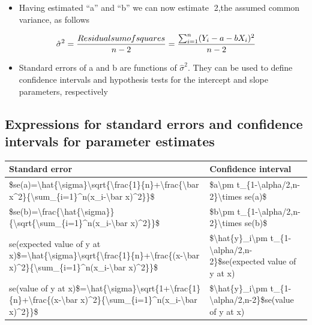 \documentclass[
]{book}
\providecommand{\tightlist}{%
  \setlength{\itemsep}{0pt}\setlength{\parskip}{0pt}}
\begin{document}
\begin{itemize}
\tightlist
\item
  Having estimated ``a'' and ``b'' we can now estimate 2,the assumed common variance, as follows
\end{itemize}

\[\hat{\sigma}^2=\frac{Residual\space sum\space of\space squares}{n-2}=\frac{\sum_{i=1}^n(Y_i-a-bX_i)^2}{n-2}\]

\begin{itemize}
\tightlist
\item
  Standard errors of a and b are functions of \(\hat{\sigma}^2\). They can be used to define confidence intervals and hypothesis tests for the intercept and slope parameters, respectively
\end{itemize}

\hypertarget{expressions-for-standard-errors-and-confidence-intervals-for-parameter-estimates}{%
\subsection{Expressions for standard errors and confidence intervals for parameter estimates}\label{expressions-for-standard-errors-and-confidence-intervals-for-parameter-estimates}}

\begin{tabular}{l|l}
\hline
Standard error & Confidence interval\\
\hline
\$se(a)=\textbackslash{}hat\{\textbackslash{}sigma\}\textbackslash{}sqrt\{\textbackslash{}frac\{1\}\{n\}+\textbackslash{}frac\{\textbackslash{}bar x\textasciicircum{}2\}\{\textbackslash{}sum\_\{i=1\}\textasciicircum{}n(x\_i-\textbackslash{}bar x)\textasciicircum{}2\}\}\$ & \$a\textbackslash{}pm t\_\{1-\textbackslash{}alpha/2,n-2\}\textbackslash{}times se(a)\$\\
\hline
\$se(b)=\textbackslash{}frac\{\textbackslash{}hat\{\textbackslash{}sigma\}\}\{\textbackslash{}sqrt\{\textbackslash{}sum\_\{i=1\}\textasciicircum{}n(x\_i-\textbackslash{}bar x)\textasciicircum{}2\}\}\$ & \$b\textbackslash{}pm t\_\{1-\textbackslash{}alpha/2,n-2\}\textbackslash{}times se(b)\$\\
\hline
se(expected value of y at x)\$=\textbackslash{}hat\{\textbackslash{}sigma\}\textbackslash{}sqrt\{\textbackslash{}frac\{1\}\{n\}+\textbackslash{}frac\{(x-\textbackslash{}bar x)\textasciicircum{}2\}\{\textbackslash{}sum\_\{i=1\}\textasciicircum{}n(x\_i-\textbackslash{}bar x)\textasciicircum{}2\}\}\$ & \$\textbackslash{}hat\{y\}\_i\textbackslash{}pm t\_\{1-\textbackslash{}alpha/2,n-2\}\$se(expected value of y at x)\\
\hline
se(value of y at x)\$=\textbackslash{}hat\{\textbackslash{}sigma\}\textbackslash{}sqrt\{1+\textbackslash{}frac\{1\}\{n\}+\textbackslash{}frac\{(x-\textbackslash{}bar x)\textasciicircum{}2\}\{\textbackslash{}sum\_\{i=1\}\textasciicircum{}n(x\_i-\textbackslash{}bar x)\textasciicircum{}2\}\}\$ & \$\textbackslash{}hat\{y\}\_i\textbackslash{}pm t\_\{1-\textbackslash{}alpha/2,n-2\}\$se(value of y at x)\\
\hline
\end{tabular}
\end{document}
